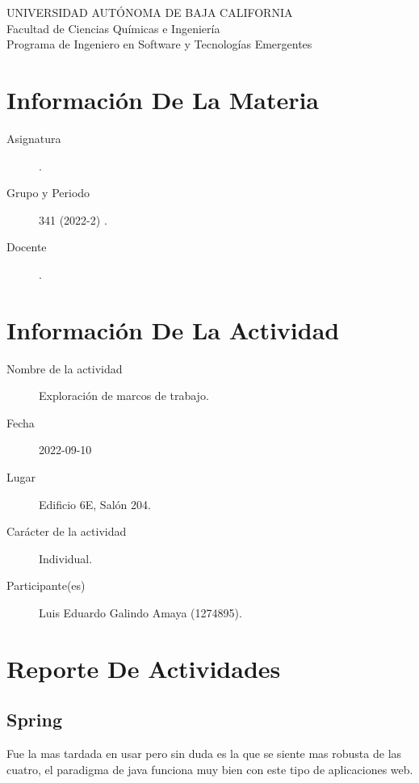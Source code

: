 \documentclass[12pt]{article}
\begin{document}
\thispagestyle{empty}
\begin{center}
	{\large
		UNIVERSIDAD AUTÓNOMA DE BAJA CALIFORNIA \\
		Facultad de Ciencias Químicas e Ingeniería }
	\vspace{0.25in} \\
	Programa de Ingeniero en Software y Tecnologías Emergentes
\end{center}

\section*{Información De La Materia}
\label{sec:org41b86f6}
\begin{mdframed}
\begin{description}
\item[{Asignatura}] \asignatura .
\item[{Grupo y Periodo}] 341 (2022-2) .
\item[{Docente}] \docente .
\end{description}
\end{mdframed}

\section*{Información De La Actividad}
\label{sec:org1dab59f}
\begin{mdframed}
\begin{description}
\item[{Nombre de la actividad}] Exploración de marcos de trabajo.
\item[{Fecha}] 2022-09-10
\item[{Lugar}] Edificio 6E, Salón 204.
\item[{Carácter de la actividad}] Individual.
\item[{Participante(es)}] Luis Eduardo Galindo Amaya (1274895).
\end{description}
\end{mdframed}

\section*{Reporte De Actividades}
\label{sec:org2c77552}
\subsection*{Spring}
\label{sec:org8829f4a}
Fue la mas tardada en usar pero sin duda es la que se siente mas robusta de las cuatro, el paradigma de java funciona muy bien con este tipo de aplicaciones web.
\end{document}
